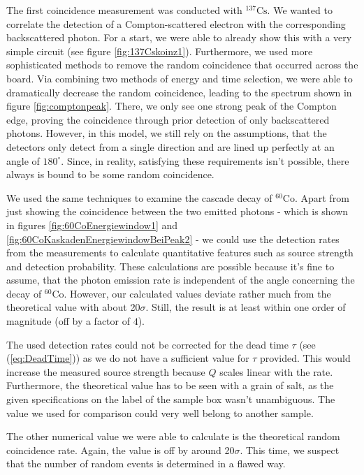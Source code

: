 %
\par
%
The first coincidence measurement was conducted with $^{137}\text{Cs}$.
We wanted to correlate the detection of a Compton-scattered electron with the corresponding backscattered photon.
For a start, we were able to already show this with a very simple circuit (see figure \ref{fig:137Cskoinz1}).
Furthermore, we used more sophisticated methods to remove the random coincidence that occurred across the board.
Via combining two methods of energy and time selection, we were able to dramatically decrease the random coincidence, leading to the spectrum shown in figure \ref{fig:comptonpeak}.
There, we only see one strong peak of the Compton edge, proving the coincidence through prior detection of only backscattered photons.
However, in this model, we still rely on the assumptions, that the detectors only detect from a single direction and are lined up perfectly at an angle of $180^{\circ}$.
Since, in reality, satisfying these requirements isn't possible, there always is bound to be some random coincidence.
%
\par
%
We used the same techniques to examine the cascade decay of $^{60}\text{Co}$.
Apart from just showing the coincidence between the two emitted photons - which is shown in figures \ref{fig:60CoEnergiewindow1} and \ref{fig:60CoKaskadenEnergiewindowBeiPeak2} - we could use the detection rates from the measurements to calculate quantitative features such as source strength and detection probability.
These calculations are possible because it's fine to assume, that the photon emission rate is independent of the angle concerning the decay of $^{60}\text{Co}$.
However, our calculated values deviate rather much from the theoretical value with about \SI{20}{}$\sigma$.
Still, the result is at least within one order of magnitude (off by a factor of $4$).
%
\par
%
The used detection rates could not be corrected for the dead time $\tau$ (see (\ref{eq:DeadTime})) as we do not have a sufficient value for $\tau$ provided.
This would increase the measured source strength because $Q$ scales linear with the rate.
Furthermore, the theoretical value has to be seen with a grain of salt, as the given specifications on the label of the sample box wasn't unambiguous.
The value we used for comparison could very well belong to another sample.
%
\par
%
The other numerical value we were able to calculate is the theoretical random coincidence rate.
Again, the value is off by around \SI{20}{}$\sigma$.
This time, we suspect that the number of random events is determined in a flawed way.
